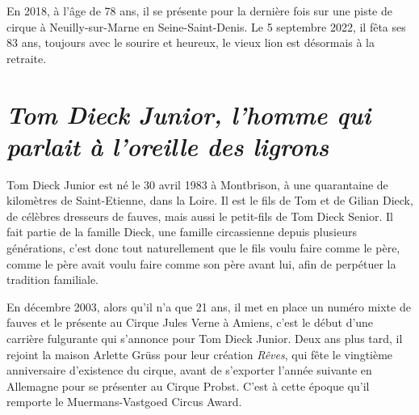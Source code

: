 En 2018, à l'âge de 78 ans, il se présente pour la dernière fois sur une piste de cirque à Neuilly-sur-Marne en Seine-Saint-Denis. Le 5 septembre 2022, il fêta ses 83 ans, toujours avec le sourire et heureux, le vieux lion est désormais à la retraite.

\section*{\textit{Tom Dieck Junior, l'homme qui parlait à l'oreille des ligrons}}

Tom Dieck Junior est né le 30 avril 1983 à Montbrison, à une quarantaine de kilomètres de Saint-Etienne, dans la Loire. Il est le fils de Tom et de Gilian Dieck, de célèbres dresseurs de fauves, mais aussi le petit-fils de Tom Dieck Senior. Il fait partie de la famille Dieck, une famille circassienne depuis plusieurs générations, c'est donc tout naturellement que le fils voulu faire comme le père, comme le père avait voulu faire comme son père avant lui, afin de perpétuer la tradition familiale.

En décembre 2003, alors qu'il n’a que 21 ans, il met en place un numéro mixte de fauves et le présente au Cirque Jules Verne à Amiens, c'est le début d'une carrière fulgurante qui s'annonce pour Tom Dieck Junior. Deux ans plus tard, il rejoint la maison Arlette Grüss pour leur création \textit{Rêves}, qui fête le vingtième anniversaire d'existence du cirque, avant de s'exporter l'année suivante en Allemagne pour se présenter au Cirque Probst. C'est à cette époque qu'il remporte le Muermans-Vastgoed Circus Award.

